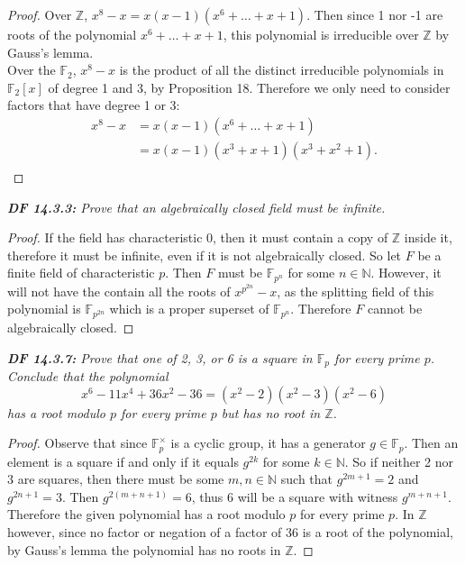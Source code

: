 \documentclass{article}
\begin{document}
  \begin{proof}
    Over $\mathbb{Z}$, $x^8-x =x(x-1)(x^6+\ldots+x+1)$. Then since 1 nor -1
    are roots of the polynomial $x^6+\ldots+x+1$, this polynomial is
    irreducible over $\mathbb{Z}$ by Gauss's lemma. \\

    Over the $\mathbb{F}_2$, $x^8-x$ is the product of all the distinct
    irreducible polynomials in $\mathbb{F}_2[x]$ of degree 1 and 3, by
    Proposition 18. Therefore we only need to consider factors that have
    degree 1 or 3: 
    \begin{align*}
      x^8-x &=x(x-1)(x^6+\ldots+x+1)\\
      &=x(x-1)(x^3+x+1)(x^3+x^2+1).\\
    \end{align*}
  \end{proof}

\it \textbf{DF 14.3.3:} Prove that an algebraically closed field must be
  infinite.

  \begin{proof}
    If the field has characteristic 0, then it must contain a copy of
    $\mathbb{Z}$ inside it, therefore it must be infinite, even if it is
    not algebraically closed. So let $F$ be a finite field of
    characteristic $p$. Then $F$ must be $\mathbb{F}_{p^n}$ for some
    $n\in\mathbb{N}$. However, it will not have the contain all the roots
    of $x^{p^{2n}}-x$, as the splitting field of this polynomial is
    $\mathbb{F}_{p^{2n}}$ which is a proper superset of $\mathbb{F}_{p^n}$.
    Therefore $F$ cannot be algebraically closed.
  \end{proof}

\it \textbf{DF 14.3.7:} Prove that one of 2, 3, or 6 is a square in
  $\mathbb{F}_p$ for every prime $p$. Conclude that the polynomial
  \[x^6-11x^4+36x^2-36 =(x^2-2)(x^2-3)(x^2-6)\]
  has a root modulo $p$ for every prime $p$ but has no root in
  $\mathbb{Z}$.

  \begin{proof}
    Observe that since $\mathbb{F}_p^\times$ is a cyclic group, it has a
    generator $g\in\mathbb{F}_p$. Then an element is a square if and only
    if it equals $g^{2k}$ for some $k\in\mathbb{N}$. So if neither 2 nor 3
    are squares, then there must be some $m,n\in\mathbb{N}$ such that
    $g^{2m+1}=2$ and $g^{2n+1}=3$. Then $g^{2(m+n+1)}=6$, thus 6 will be
    a square with witness $g^{m+n+1}$. \\

    Therefore the given polynomial has a root modulo $p$ for every prime
    $p$. In $\mathbb{Z}$ however, since no factor or negation of a factor
    of 36 is a root of the polynomial, by Gauss's lemma the polynomial has
    no roots in $\mathbb{Z}$.
  \end{proof}
\end{document}
